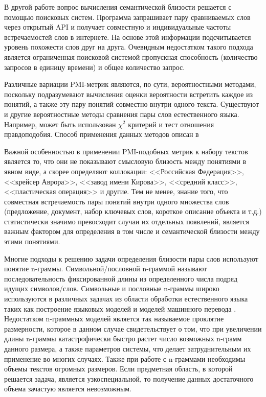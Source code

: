 В другой работе \cite{search_eng} вопрос вычисления семантической близости решается с помощью поисковых систем. Программа запрашивает пару сравниваемых слов через открытый API и получает совместную и индивидуальные частоты встречаемостей слов в интернете. На основе этой информации подсчитывается уровень похожести слов друг на друга. Очевидным недостатком такого подхода является ограниченная поисковой системой пропускная способность (количество запросов в единицу времени) и общее количество запрос.

Различные вариации PMI-метрик являются, по сути, вероятностными методами, поскольку подразумевают вычисления оценки вероятности встретить каждое из понятий, а также эту пару понятий совместно внутри одного текста. Существуют и другие вероятностные методы сравнения пары слов естественного языка. Например, может быть использован $\chi^2$ критерий и тест отношения правдоподобия. Способ применения данных методов описан в \cite{freq_est_overview}

Важной особенностью в применении PMI-подобных метрик к набору текстов является то, что они не показывают смысловую близость между понятиями в явном виде, а скорее определяют коллокации: <<Российская Федерация>>, <<крейсер Аврора>>, <<завод имени Кирова>>, <<средний класс>>, <<пластическая операция>> и другие. Тем не менее, знание того, что совместная встречаемость пары понятий внутри одного множества слов (предложение, документ, набор ключевых слов, короткое описание объекта и т.д.) статистически значимо превосходит случаи их отдельных появлений, является важным фактором для определения в том числе и семантической близости между этими понятиями.

Многие подходы к решению задачи определения близости пары слов используют понятие n-граммы.
Cимвольной/пословной n-граммой называют последовательность фиксированной длины из определенного числа подряд идущих символов/слов. Символьные и пословные n-граммы широко используются в различных задачах из области обработки естественного языка таких как построение языковых моделей \cite{ngrams_1,ngrams_2,ngrams_3,ngrams_4} и моделей машинного перевода \cite{ngrams_mt_1,ngrams_mt_2,ngrams_mt_3}. Недостатком n-граммных моделей является так называемое проклятие размерности, которое в данном случае свидетельствует о том, что при увеличении длины n-граммы катастрофически быстро растет число возможных n-грамм данного размера, а также параметров системы, что делает затруднительным их применение во многих случаях. Также при работе с n-граммами необходимы объемы текстов огромных размеров. Если предметная область, в которой решается задача, является узкоспециальной, то получение данных достаточного объема зачастую является невозможным.

